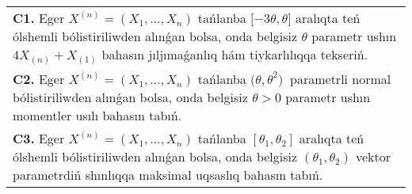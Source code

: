 \documentclass{article}
\begin{document}
\begin{tabular}{m{17cm}}
 \\
\textbf{C1.} 
Eger \(X^{(n)} = \left( X_{1},...,X_{n} \right)\) tańlanba \(\lbrack - 3\theta,\theta\rbrack\) aralıqta teń ólshemli bólistiriliwden alınǵan bolsa, onda belgisiz \(\theta\) parametr ushın \(4X_{(n)} + X_{(1)}\) bahasın jıljımaǵanlıq hám tiykarlılıqqa tekseriń.
 \\
\textbf{C2.} 
Eger \(X^{(n)} = \left( X_{1},...,X_{n} \right)\) tańlanba \({(\theta,\theta}^{2})\ \) parametrli normal bólistiriliwden alınǵan bolsa, onda belgisiz \(\theta > 0\) parametr ushın momentler usılı bahasın tabıń.
 \\
\textbf{C3.} 
Eger \(X^{(n)} = \left( X_{1},...,X_{n} \right)\) tańlanba \(\left\lbrack \theta_{1},\theta_{2} \right\rbrack\) aralıqta teń ólshemli bólistiriliwden alınǵan bolsa, onda belgisiz \(\left( \theta_{1},\theta_{2} \right)\) vektor parametrdiń shınlıqqa maksimal uqsaslıq bahasın tabıń.
 \\

\end{tabular}
\vspace{1cm}
\end{document}
